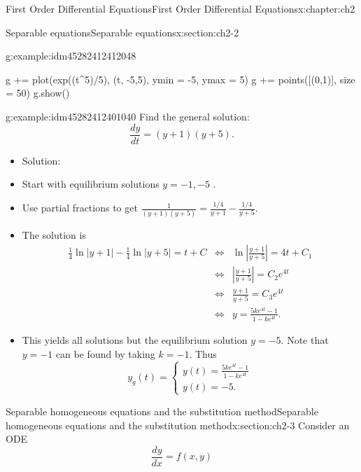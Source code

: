 \documentclass[oneside,10pt,]{book}
\numberwithin{equation}{section}
\numberwithin{equation}{section}
\newcommand{\amp}{&}
\begin{document}
\begin{chapterptx}{First Order Differential Equations}{}{First Order Differential Equations}{}{}{x:chapter:ch2}
\begin{sectionptx}{Separable equations}{}{Separable equations}{}{}{x:section:ch2-2}
\begin{example}{}{g:example:idm45282412412048}
\begin{sageinput}
g += plot(exp((t^5)/5), (t, -5,5), ymin = -5, ymax = 5)
g += points([(0,1)], size = 50)
g.show()
\end{sageinput}
\end{example}
\begin{example}{}{g:example:idm45282412401040}%
Find the general solution:%
\begin{equation*}
\frac{dy}{dt}=\left(y+1\right)\left(y+5\right).
\end{equation*}
%
%
\begin{itemize}[label=\textbullet]
\item{}Solution:%
\item{}Start with equilibrium solutions \(y=-1,-5\) .%
\item{}Use partial fractions to get \(\frac{1}{\left(y+1\right)\left(y+5\right)}=\frac{1/4}{y+1}-\frac{1/4}{y+5}\).%
\item{}The solution is%
\begin{align*}
\frac{1}{4}\ln\left|y+1\right|-\frac{1}{4}\ln\left|y+5\right|=t+C \amp \iff \amp \ln\left|\frac{y+1}{y+5}\right|=4t+C_{1}\\
\amp \iff \amp \left|\frac{y+1}{y+5}\right|=C_{2}e^{4t}\\
\amp \iff \amp \frac{y+1}{y+5}=C_{3}e^{4t}\\
\amp \iff \amp y=\frac{5ke^{4t}-1}{1-ke^{4t}}.
\end{align*}
%
\item{}This yields all solutions but the equilibrium solution \(y=-5\). Note that \(y=-1\) can be found by taking \(k=-1\). Thus%
\begin{equation*}
y_g(t) =  \begin{cases}
y(t)=\frac{5ke^{4t}-1}{1-ke^{4t}}\\
y(t)=-5.
\end{cases}
\end{equation*}
%
\end{itemize}
\end{example}
\end{sectionptx}
%
%
\typeout{************************************************}
\typeout{************************************************}
%
\begin{sectionptx}{Separable homogeneous equations and the substitution method}{}{Separable homogeneous equations and the substitution method}{}{}{x:section:ch2-3}
Consider an ODE%
\begin{equation*}
\frac{dy}{dx}=f\left(x,y\right)

\end{equation*}
\end{sectionptx}
\end{chapterptx}
\end{document}
